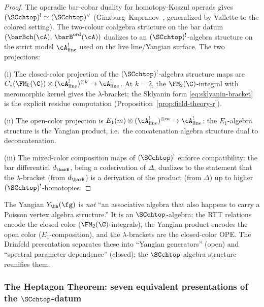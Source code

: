 \begin{proof}
The operadic bar-cobar duality for homotopy-Koszul operads
gives $(\SCchtop)^! \simeq (\SCchtop)^{\vee}$
(Ginzburg--Kapranov~\cite{GK94}, generalized by Vallette
\cite{Val07} to the colored setting). The
two-colour coalgebra structure on the bar datum $(\barBch(\cA),\, \barB^{\mathrm{ord}}(\cA))$ dualizes to an
$(\SCchtop)^{!}$-algebra structure on the strict model
$\cA^!_{\mathrm{line}}$ used on the live line/Yangian surface.
The two projections:

(i) The closed-color projection of the $(\SCchtop)^{!}$-algebra
structure maps are
$C_\ast(\FM_k(\C)) \otimes
(\cA^!_{\mathrm{line}})^{\otimes k}
\to \cA^!_{\mathrm{line}}$.
At $k = 2$, the $\FM_2(\C)$-integral with meromorphic kernel
gives the $\lambda$-bracket; the Sklyanin form
\eqref{eq:sklyanin-bracket} is the explicit residue computation
(Proposition~\ref{prop:field-theory-r}).

(ii) The open-color projection is
$E_1(m) \otimes (\cA^!_{\mathrm{line}})^{\otimes m}
\to \cA^!_{\mathrm{line}}$: the
$E_1$-algebra structure is the Yangian product, i.e.\ the
concatenation algebra structure dual to deconcatenation.

(iii) The mixed-color composition maps of $(\SCchtop)^{!}$ enforce
compatibility: the bar differential $d_{\barB}$, being a
coderivation of $\Delta$, dualizes to the statement that the
$\lambda$-bracket (from $d_{\barB}$) is a derivation of the
product (from $\Delta$) up to higher $(\SCchtop)^{!}$-homotopies.
\end{proof}

\begin{remark}
\label{rem:not-accidental}
The Yangian $Y_\hh(\fg)$ is \emph{not} ``an associative algebra
that also happens to carry a Poisson vertex algebra structure.''
It is an $\SCchtop$-algebra: the RTT relations encode the
closed color ($\FM_2(\C)$-integrals), the Yangian product
encodes the open color ($E_1$-composition), and the
$\lambda$-brackets are the closed-color OPE\@. The Drinfeld
presentation separates these into ``Yangian generators'' (open)
and ``spectral parameter dependence'' (closed); the
$\SCchtop$-algebra structure reunifies them.
\end{remark}

\subsubsection*{The Heptagon Theorem: seven equivalent presentations
of the $\SCchtop$-datum}

